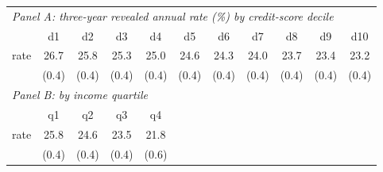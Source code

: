 \begin{tabular}{l*{10}{c}}
\toprule
\multicolumn{11}{l}{\emph{Panel A: three-year revealed annual rate (\%) by credit-score decile}} \\
 & d1 & d2 & d3 & d4 & d5 & d6 & d7 & d8 & d9 & d10 \\
\midrule
rate & 26.7 & 25.8 & 25.3 & 25.0 & 24.6 & 24.3 & 24.0 & 23.7 & 23.4 & 23.2 \\
 & (0.4) & (0.4) & (0.4) & (0.4) & (0.4) & (0.4) & (0.4) & (0.4) & (0.4) & (0.4) \\
\midrule
\multicolumn{11}{l}{\emph{Panel B: by income quartile}} \\
 & q1 & q2 & q3 & q4 & \multicolumn{6}{c}{} \\
\midrule
rate & 25.8 & 24.6 & 23.5 & 21.8 & \multicolumn{6}{c}{} \\
 & (0.4) & (0.4) & (0.4) & (0.6) & \multicolumn{6}{c}{} \\
\bottomrule
\end{tabular}